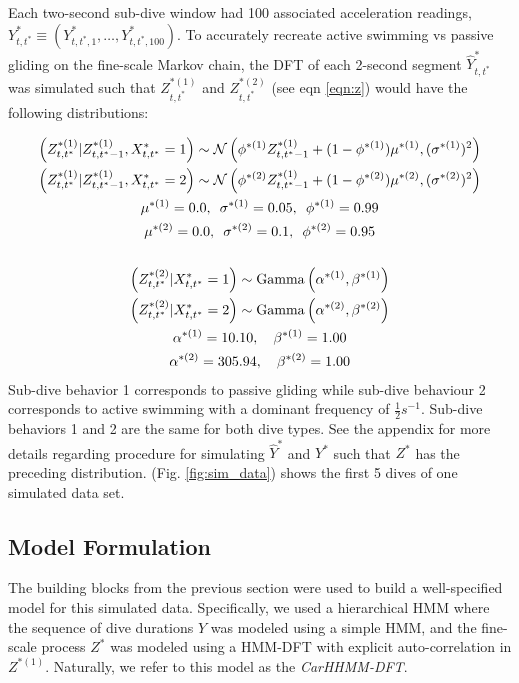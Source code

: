 Each two-second sub-dive window had 100 associated acceleration readings, $Y^*_{t,t^*} \equiv \left(Y^*_{t,t^*,1}, \ldots, Y^*_{t,t^*,100}\right)$. To accurately recreate active swimming vs passive gliding on the fine-scale Markov chain, the DFT of each 2-second segment $\hat Y^*_{t,t^*}$ was simulated such that $Z^{*(1)}_{t,t^*}$ and $Z^{*(2)}_{t,t^*}$ (see eqn \ref{eqn:z}) would have the following distributions: 

\begin{gather*}
    \left(Z^{*(1)}_{t,t^*} | Z^{*(1)}_{t,t^*-1}, X^*_{t,t^*} = 1 \right) \sim \mathcal{N} \left(\phi^{*(1)}Z^{*(1)}_{t,t^*-1} + (1-\phi^{*(1)})\mu^{*(1)}, (\sigma^{*(1)})^2 \right) \\
    \left(Z^{*(1)}_{t,t^*} | Z^{*(1)}_{t,t^*-1}, X^*_{t,t^*} = 2 \right) \sim \mathcal{N} \left(\phi^{*(2)}Z^{*(1)}_{t,t^*-1} + (1-\phi^{*(2)})\mu^{*(2)}, (\sigma^{*(2)})^2 \right) \\
    \mu^{*(1)} = 0.0,\enspace \sigma^{*(1)} = 0.05,\enspace \phi^{*(1)} = 0.99 \\
    \mu^{*(2)} = 0.0,\enspace \sigma^{*(2)} = 0.1,\enspace \phi^{*(2)} = 0.95 \\\\
    \left(Z^{*(2)}_{t,t^*} | X^*_{t,t^*} = 1\right) \sim {\rm{Gamma}}\left(\alpha^{*(1)}, \beta^{*(1)} \right) \\
    \left(Z^{*(2)}_{t,t^*} | X^*_{t,t^*} = 2\right) \sim {\rm{Gamma}}\left(\alpha^{*(2)}, \beta^{*(2)} \right) \\
    \alpha^{*(1)} = 10.10, \enspace \enspace \beta^{*(1)} = 1.00 \\
    \alpha^{*(2)} = 305.94, \enspace \enspace \beta^{*(2)} = 1.00
\end{gather*}
%
Sub-dive behavior 1 corresponds to passive gliding while sub-dive behaviour 2 corresponds to active swimming with a dominant frequency of $\frac{1}{2}s^{-1}$. Sub-dive behaviors 1 and 2 are the same for both dive types. See the appendix for more details regarding procedure for simulating $\hat Y^*$ and $Y^*$ such that $Z^*$ has the preceding distribution. (Fig. \ref{fig:sim_data}) shows the first 5 dives of one simulated data set.

\subsection{Model Formulation}
\label{subsec:model_structure}

The building blocks from the previous section were used to build a well-specified model for this simulated data. Specifically, we used a hierarchical HMM where the sequence of dive durations $Y$ was modeled using a simple HMM, and the fine-scale process $Z^*$ was modeled using a HMM-DFT with explicit auto-correlation in $Z^{*(1)}$. Naturally, we refer to this model as the \textit{CarHHMM-DFT}.


